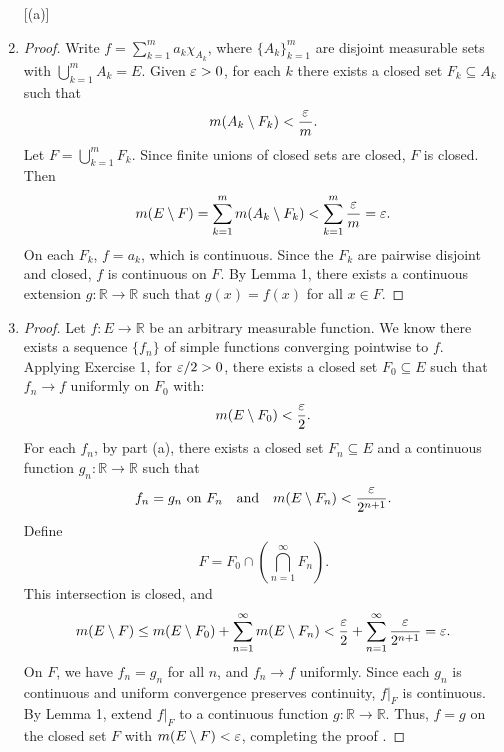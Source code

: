 \documentclass[11pt]{article}
\begin{document}
\begin{exercise}{2}
    \begin{enumerate} [(a)]
        \item \begin{proof} Write \( f = \sum_{k=1}^m a_k \chi_{A_k} \), where \( \{A_k\}_{k=1}^m \) are disjoint measurable sets with \( \bigcup_{k=1}^m A_k = E \). Given \( \varepsilon > 0 \), for each $k$ there exists a closed set \( F_k \subseteq A_k \) such that
\[
m(A_k \setminus F_k) < \frac{\varepsilon}{m}.
\]
Let \( F = \bigcup_{k=1}^m F_k \). Since finite unions of closed sets are closed, \( F \) is closed. Then
\[
m(E \setminus F) = \sum_{k=1}^m m(A_k \setminus F_k) < \sum_{k=1}^m \frac{\varepsilon}{m} = \varepsilon.
\]
On each \( F_k \), \( f = a_k \), which is continuous. Since the \( F_k \) are pairwise disjoint and closed, \( f \) is continuous on \( F \). By Lemma 1, there exists a continuous extension \( g: \mathbb{R} \to \mathbb{R} \) such that \( g(x) = f(x) \) for all \( x \in F \). \end{proof}
\item  \begin{proof} Let \( f: E \to \mathbb{R} \) be an arbitrary measurable function. We know there exists a sequence \( \{f_n\} \) of simple functions converging pointwise to \( f \). Applying Exercise 1, for \( \varepsilon/2 > 0 \), there exists a closed set \( F_0 \subseteq E \) such that \( f_n \to f \) uniformly on \( F_0 \) with:
    \[
    m(E \setminus F_0) < \frac{\varepsilon}{2}.
    \]
For each \( f_n \), by part (a), there exists a closed set \( F_n \subseteq E \) and a continuous function \( g_n: \mathbb{R} \to \mathbb{R} \) such that
    \[
    f_n = g_n \text{ on } F_n \quad \text{and} \quad m(E \setminus F_n) < \frac{\varepsilon}{2^{n+1}}.
    \]
Define
    \[
    F = F_0 \cap \left( \bigcap_{n=1}^\infty F_n \right).
    \]
    This intersection is closed, and
    \[
    m(E \setminus F) \leq m(E \setminus F_0) + \sum_{n=1}^\infty m(E \setminus F_n) < \frac{\varepsilon}{2} + \sum_{n=1}^\infty \frac{\varepsilon}{2^{n+1}} = \varepsilon.
    \]
    On \( F \), we have \( f_n = g_n \) for all \( n \), and \( f_n \to f \) uniformly. Since each \( g_n \) is continuous and uniform convergence preserves continuity, \( f|_F \) is continuous. By Lemma 1, extend \( f|_F \) to a continuous function \( g: \mathbb{R} \to \mathbb{R} \).
    Thus, \( f = g \) on the closed set \( F \) with \( m(E \setminus F) < \varepsilon \), completing the proof .
\end{proof}
    \end{enumerate}
\end{exercise}
\end{document}
